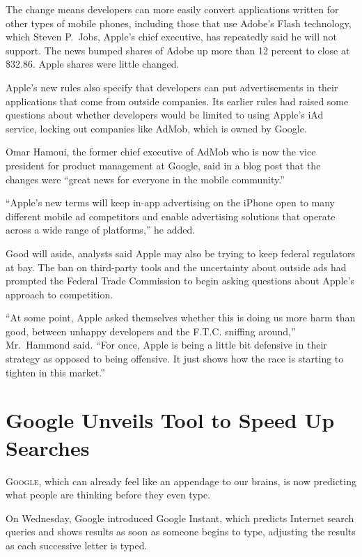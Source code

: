 ﻿\documentclass[12pt]{article}
\begin{document}
The change means developers can more easily convert applications written for other types of mobile
phones, including those that use Adobe's Flash technology, which Steven P.~Jobs, Apple's chief
executive, has repeatedly said he will not support. The news bumped shares of Adobe up more than 12
percent to close at \$32.86. Apple shares were little changed.

Apple's new rules also specify that developers can put advertisements in their applications that
come from outside companies. Its earlier rules had raised some questions about whether developers
would be limited to using Apple's iAd service, locking out companies like AdMob, which is owned by
Google.

Omar Hamoui, the former chief executive of AdMob who is now the vice president for product
management at Google, said in a blog post that the changes were ``great news for everyone in the
mobile community.''

``Apple's new terms will keep in-app advertising on the iPhone open to many different mobile ad
competitors and enable advertising solutions that operate across a wide range of platforms,'' he
added.

Good will aside, analysts said Apple may also be trying to keep federal regulators at bay. The ban
on third-party tools and the uncertainty about outside ads had prompted the Federal Trade Commission
to begin asking questions about Apple's approach to competition.

``At some point, Apple asked themselves whether this is doing us more harm than good, between
unhappy developers and the F.T.C. sniffing around,'' Mr.~Hammond said. ``For once, Apple is being a
little bit defensive in their strategy as opposed to being offensive. It just shows how the race is
starting to tighten in this market.''

\pagebreak
\section{Google Unveils Tool to Speed Up Searches}

\lettrine{G}{oogle}, which can already feel like an appendage to our
brains, is now predicting what people are thinking before they even type.

On Wednesday, Google introduced Google Instant, which predicts Internet search queries and shows
results as soon as someone begins to type, adjusting the results as each successive letter is typed.
\end{document}
